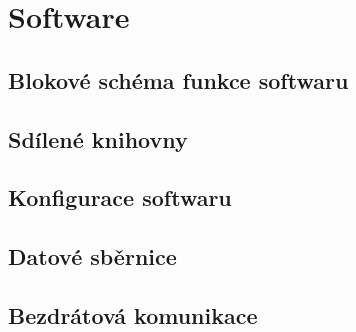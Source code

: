 \chapter*{Software}

\section{Blokové schéma funkce softwaru}

\section{Sdílené knihovny}

\section{Konfigurace softwaru}

\section{Datové sběrnice}

\section{Bezdrátová komunikace}

\newpage